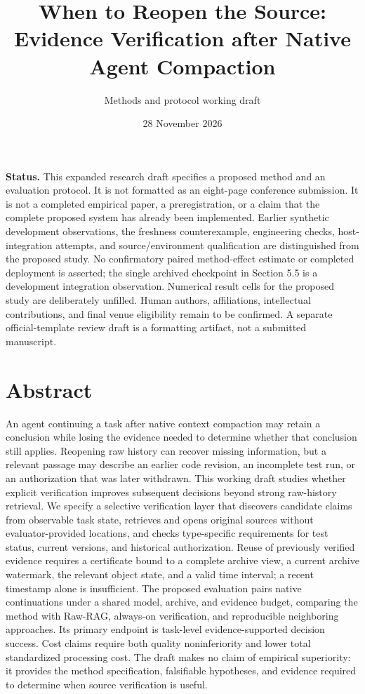 \documentclass[
  11pt,
  a4paper,
]{article}
\title{When to Reopen the Source: Evidence Verification after Native
Agent Compaction}
\subtitle{Methods and protocol working draft}
\author{}
\date{28 November 2026}
\begin{document}
\maketitle

\textbf{Status.} This expanded research draft specifies a proposed
method and an evaluation protocol. It is not formatted as an eight-page
conference submission. It is not a completed empirical paper, a
preregistration, or a claim that the complete proposed system has
already been implemented. Earlier synthetic development observations,
the freshness counterexample, engineering checks, host-integration
attempts, and source/environment qualification are distinguished from
the proposed study. No confirmatory paired method-effect estimate or
completed deployment is asserted; the single archived checkpoint in
Section 5.5 is a development integration observation. Numerical result
cells for the proposed study are deliberately unfilled. Human authors,
affiliations, intellectual contributions, and final venue eligibility
remain to be confirmed. A separate official-template review draft is a
formatting artifact, not a submitted manuscript.

\section{Abstract}\label{abstract}

An agent continuing a task after native context compaction may retain a
conclusion while losing the evidence needed to determine whether that
conclusion still applies. Reopening raw history can recover missing
information, but a relevant passage may describe an earlier code
revision, an incomplete test run, or an authorization that was later
withdrawn. This working draft studies whether explicit verification
improves subsequent decisions beyond strong raw-history retrieval. We
specify a selective verification layer that discovers candidate claims
from observable task state, retrieves and opens original sources without
evaluator-provided locations, and checks type-specific requirements for
test status, current versions, and historical authorization. Reuse of
previously verified evidence requires a certificate bound to a complete
archive view, a current archive watermark, the relevant object state,
and a valid time interval; a recent timestamp alone is insufficient. The
proposed evaluation pairs native continuations under a shared model,
archive, and evidence budget, comparing the method with Raw-RAG,
always-on verification, and reproducible neighboring approaches. Its
primary endpoint is task-level evidence-supported decision success. Cost
claims require both quality noninferiority and lower total standardized
processing cost. The draft makes no claim of empirical superiority: it
provides the method specification, falsifiable hypotheses, and evidence
required to determine when source verification is useful.
\end{document}
